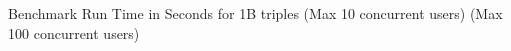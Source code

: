 \centering
Benchmark Run Time in Seconds for 1B triples\newline
(Max 10 concurrent users) (Max 100 concurrent users)